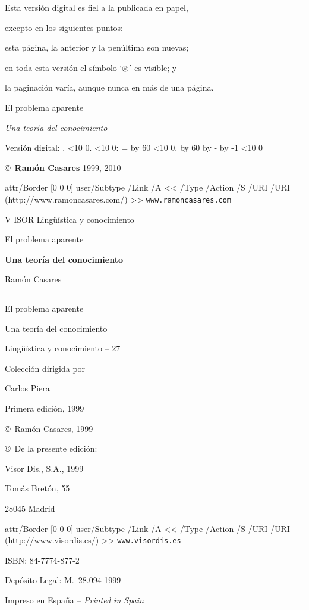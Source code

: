 \vglue 2pc

Esta versión digital es fiel a la publicada en papel,\par
excepto en los siguientes puntos:\par
esta página, la anterior y la penúltima son nuevas;\par 
en toda esta versión el símbolo `$\prl$' es visible; y\par
la paginación varía, aunque nunca en más de una página.\par

\vglue 2pc

\def\epaversion{\the\year.%
 \ifnum\month<10 0\fi \the\month.%
 \ifnum\day<10 0\fi\the\day:%
  \count255=\time \divide\count255 by 60
 \ifnum\count255<10 0\fi \the\count255.%
  \multiply\count255 by 60 \advance\count255 by -\time
  \multiply\count255 by -1
 \ifnum\count255<10 0\fi \the\count255}

 {\lmtwo El problema aparente}\par
 {\sl Una teoría del conocimiento}\par
 Versión digital: \epaversion \par
 \copyright\ {\bf Ramón Casares} 1999, 2010\par
 \leavevmode \pdfcode \pdfstartlink attr{/Border [0 0 0]}
   user{/Subtype /Link /A << /Type /Action
    /S /URI /URI (http://www.ramoncasares.com/) >>}\pdfendcode
  {\tt www.ramoncasares.com}\pdfcode \pdfendlink \pdfendcode \par

\break %

\centerline{\lmxiibf V{\lmviiibf\kern-1pt ISOR}
        Lingüística y conocimiento}\newpage %


\null\newpage %

\centerline{\lmxiibf El problema aparente}
\centerline{\bf Una teoría del conocimiento}
\newpage %
\null\newpage %

\centerline{\lmone Ramón Casares}
\vskip 9pt
\hrule height 1pt
\vskip 12pt
\centerline{\lmxiizero El problema aparente}
\vskip 1pc
\centerline{\lmxiione Una teoría del conocimiento}
\vfill \break %

\centerline{\lmxiibf Lingüística y conocimiento -- 27}
\centerline{Colección dirigida por}
\centerline{Carlos Piera}
\vskip4pc
\centerline{Primera edición, 1999}
\vfil
\centerline{\copyright\ Ramón Casares, 1999}
\centerline{\copyright\ De la presente edición:}
\centerline{\sc Visor Dis., S.A., 1999}
\centerline{Tomás Bretón, 55}
\centerline{28045 Madrid}
\centerline{\pdfcode \pdfstartlink attr{/Border [0 0 0]}
   user{/Subtype /Link /A << /Type /Action
    /S /URI /URI (http://www.visordis.es/) >>}\pdfendcode
  {\tt www.visordis.es}\pdfcode \pdfendlink \pdfendcode}
\smallskip
\centerline{ISBN: 84-7774-877-2}
\centerline{Depósito Legal: M.\ 28.094-1999}
\smallskip
\centerline{Impreso en España -- \it Printed in Spain}
\break %

